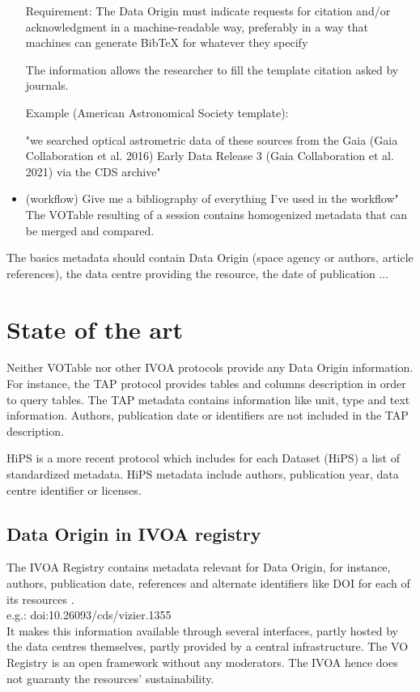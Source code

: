 \documentclass[11pt,a4paper]{ivoa}
\begin{document}
\begin{itemize}
	Requirement: The Data Origin must indicate requests for citation and/or acknowledgment in a machine-readable way, preferably in a way that machines can generate BibTeX for whatever they specify
	
	The information allows the researcher to fill the template citation asked by journals.
	
	Example (American Astronomical Society template):
	
	"we searched optical astrometric data of these sources from the Gaia (Gaia Collaboration et al. 2016) Early Data Release 3 (Gaia Collaboration et al. 2021) via the CDS archive"
	
	\item (workflow) Give me a bibliography of everything I've used in the workflow"
	The VOTable resulting of a session contains homogenized metadata that can be merged and compared.
	
\end{itemize}

The basics metadata should contain Data Origin (space agency or authors, article references), the data centre providing the resource, the date of publication ...

\section{State of the art}

Neither VOTable \citep{2019ivoa.spec.1021O} nor other IVOA protocols provide any Data Origin information. For instance, the TAP protocol \citep{2019ivoa.spec.0927D} provides tables and columns description in order to query tables. The TAP metadata contains information like unit, type and text information. Authors, publication date or identifiers are not included in the TAP description.

HiPS \citep{2017ivoa.spec.0519F} is a more recent protocol which includes for each Dataset (HiPS) a list of standardized metadata. HiPS metadata include authors, publication year, data centre identifier or licenses.


\subsection{Data Origin in IVOA registry}
The IVOA Registry contains metadata relevant for Data Origin, for instance, authors, publication date, references and alternate identifiers like DOI for each of its resources \citep{2018ivoa.spec.0625P}.\\
e.g.: doi:10.26093/cds/vizier.1355 \\
It makes this information available through several interfaces, partly
hosted by the data centres themselves, partly provided by a central
infrastructure.
The VO Registry is an open framework without any moderators.
The IVOA hence does not guaranty the resources' sustainability.
\end{document}
